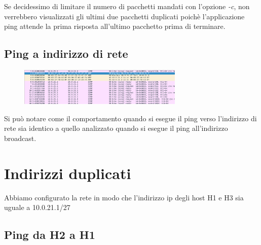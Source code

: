\documentclass{article}
\begin{document}
Se decidessimo di limitare il numero di pacchetti mandati con l'opzione \textit{-c}, non verrebbero visualizzati gli ultimi due pacchetti duplicati poichè l’applicazione ping attende la prima risposta all’ultimo pacchetto prima di terminare.
\pagebreak
\subsection{Ping a indirizzo di rete}

\hspace{1.2cm}
\begin{figure} %
    \centering
    \includegraphics[width=0.7\textwidth]{indirizzorete.png}
\end{figure}

Si può notare come il comportamento quando si esegue il ping verso l’indirizzo di rete sia identico a quello analizzato quando si esegue il ping all’indirizzo broadcast.

\section{Indirizzi duplicati}

Abbiamo configurato la rete in modo che l’indirizzo ip degli host H1 e H3 sia uguale a 10.0.21.1/27

\subsection{Ping da H2 a H1}
\end{document}
